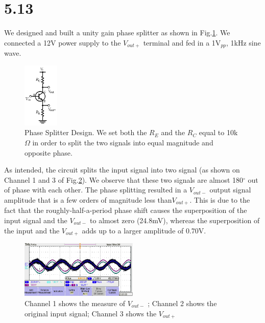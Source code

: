 \documentclass[authoryear, 12pt,5p, times]{elsarticle}
\begin{document}
\section*{5.13}
\par We designed and built a unity gain phase splitter as shown in Fig.\ref{q12setup}. We connected a 12V power supply to the $V_{out +}$ terminal and fed in a 1V$_{pp}$, 1kHz sine wave. 
   \begin{figure}[h!]
 \centering
 \includegraphics[width=0.15\textwidth]{figure/q13setup}
\caption{Phase Splitter Design. We set both the $R_E$ and the $R_C$ equal to 10k$\Omega$ in order to split the two signals into equal magnitude and opposite phase.}
\label{q12setup}
 \end{figure}
\par As intended, the circuit splits the input signal into two signal (as shown on Channel 1 and 3 of Fig.\ref{q13trace}). We observe that these two signals are almost 180$^{\circ}$ out of phase with each other. The phase splitting resulted in a $V_{out -}$ output signal amplitude that is a few orders of magnitude less than$V_{out +}$. This is due to the fact that the roughly-half-a-period phase shift causes the superposition of the input signal and the $V_{out - }$ to almost zero (24.8mV), whereas the superposition of the input and  the $V_{out + }$ adds up to a larger amplitude of 0.70V.  
    \begin{figure}[h!]
 \centering
 \includegraphics[width=0.5\textwidth]{figure/q13trace}
\caption{Channel 1 shows the measure of $V_{out - }$ ; Channel 2 shows the original input signal; Channel 3 shows the $V_{out +}$}
\label{q13trace}
 \end{figure}
\end{document}
